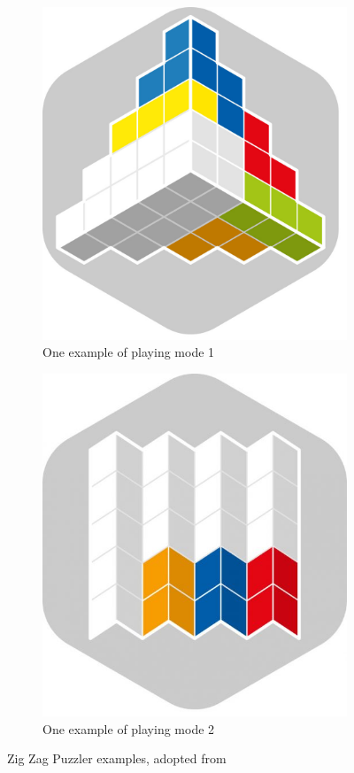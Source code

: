 \begin{figure}[htbp]
\begin{subfigure}[b]{0.32\textwidth}
    \includegraphics[width=\textwidth]{figs/zig_zag_mode1.jpg}
    \caption{One example of playing mode 1}
    \end{subfigure}
    \begin{subfigure}[b]{0.32\textwidth}
    \includegraphics[width=\textwidth]{figs/zig_zag_mode2.jpg}
    \caption{One example of playing mode 2}
    \end{subfigure}
    \caption{Zig Zag Puzzler examples, adopted from~\cite{r23}}
    \label{fig:ZIG_ZAG_Puzzler_playing_modes}
\end{figure}
